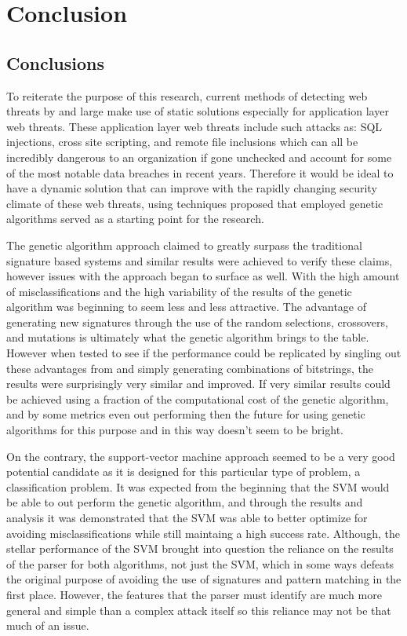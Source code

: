 \chapter{Conclusion}

\section{Conclusions}

To reiterate the purpose of this research, current methods of detecting web threats by and large make use of static solutions especially for application layer web threats.  These application layer web threats include such attacks as: SQL injections, cross site scripting, and remote file inclusions which can all be incredibly dangerous to an organization if gone unchecked and account for some of the most notable data breaches in recent years.  Therefore it would be ideal to have a dynamic solution that can improve with the rapidly changing security climate of these web threats, using techniques proposed that employed genetic algorithms served as a starting point for the research.  

The genetic algorithm approach claimed to greatly surpass the traditional signature based systems and similar results were achieved to verify these claims, however issues with the approach began to surface as well.  With the high amount of misclassifications and the high variability of the results of the genetic algorithm was beginning to seem less and less attractive.  The advantage of generating new signatures through the use of the random selections, crossovers, and mutations is ultimately what the genetic algorithm brings to the table.  However when tested to see if the performance could be replicated by singling out these advantages from and simply generating combinations of bitstrings, the results were surprisingly very similar and improved.  If very similar results could be achieved using a fraction of the computational cost of the genetic algorithm, and by some metrics even out performing then the future for using genetic algorithms for this purpose and in this way doesn't seem to be bright.

On the contrary, the support-vector machine approach seemed to be a very good potential candidate as it is designed for this particular type of problem, a classification problem.  It was expected from the beginning that the SVM would be able to out perform the genetic algorithm, and through the results and analysis it was demonstrated that the SVM was able to better optimize for avoiding misclassifications while still maintaing a high success rate.  Although, the stellar performance of the SVM brought into question the reliance on the results of the parser for both algorithms, not just the SVM, which in some ways defeats the original purpose of avoiding the use of signatures and pattern matching in the first place.  However, the features that the parser must identify are much more general and simple than a complex attack itself so this reliance may not be that much of an issue.

